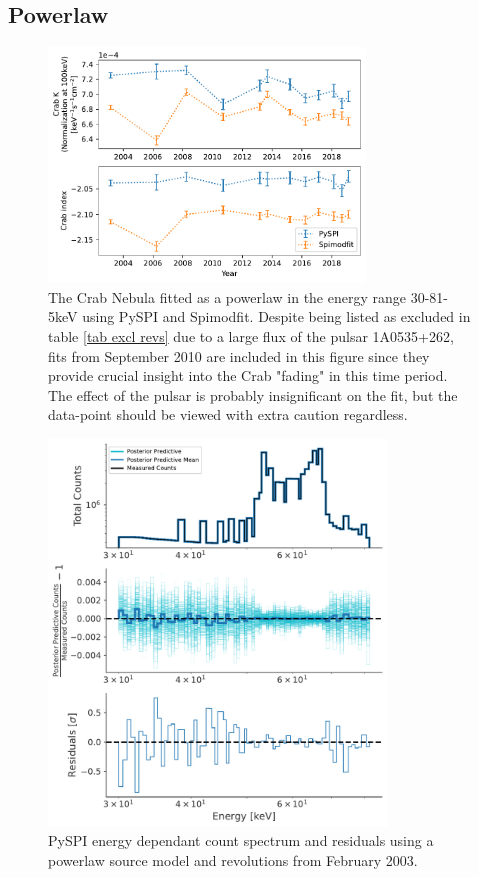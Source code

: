 \documentclass{report}
\begin{document}
\subsection{Powerlaw}
\begin{figure}[h]
  \centering
  \includegraphics[width=0.75\textwidth]{Images/Crab_Fits/crab_low_energy_pl.pdf}
  \caption{The Crab Nebula fitted as a powerlaw in the energy range 30-81-5keV using PySPI and Spimodfit. Despite being listed as excluded in table \ref{tab excl revs} due to a large flux of the pulsar 1A0535+262, fits from September 2010 are included in this figure since they provide crucial insight into the Crab "fading" in this time period. The effect of the pulsar is probably insignificant on the fit, but the data-point should be viewed with extra caution regardless.}
  \label{fig crab pl}
\end{figure}

\begin{figure}[h]
  \centering
  \includegraphics[width=0.8\textwidth]{Images/Crab_Fits/energy_residual_plot_pl.pdf}
  \caption{PySPI energy dependant count spectrum and residuals using a powerlaw source model and revolutions from February 2003.}
  \label{fig res pl}
\end{figure}
\end{document}
